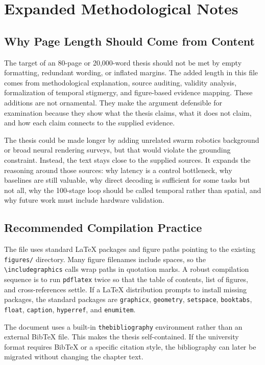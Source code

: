 \documentclass[12pt,a4paper,oneside]{report}
\begin{document}
\chapter{Expanded Methodological Notes}

\section{Why Page Length Should Come from Content}

The target of an 80-page or 20,000-word thesis should not be met by empty formatting, redundant wording, or inflated margins. The added length in this file comes from methodological explanation, source auditing, validity analysis, formalization of temporal stigmergy, and figure-based evidence mapping. These additions are not ornamental. They make the argument defensible for examination because they show what the thesis claims, what it does not claim, and how each claim connects to the supplied evidence.

The thesis could be made longer by adding unrelated swarm robotics background or broad neural rendering surveys, but that would violate the grounding constraint. Instead, the text stays close to the supplied sources. It expands the reasoning around those sources: why latency is a control bottleneck, why baselines are still valuable, why direct decoding is sufficient for some tasks but not all, why the 100-stage loop should be called temporal rather than spatial, and why future work must include hardware validation.

\section{Recommended Compilation Practice}

The file uses standard LaTeX packages and figure paths pointing to the existing \texttt{figures/} directory. Many figure filenames include spaces, so the \texttt{\textbackslash includegraphics} calls wrap paths in quotation marks. A robust compilation sequence is to run \texttt{pdflatex} twice so that the table of contents, list of figures, and cross-references settle. If a LaTeX distribution prompts to install missing packages, the standard packages are \texttt{graphicx}, \texttt{geometry}, \texttt{setspace}, \texttt{booktabs}, \texttt{float}, \texttt{caption}, \texttt{hyperref}, and \texttt{enumitem}.

The document uses a built-in \texttt{thebibliography} environment rather than an external BibTeX file. This makes the thesis self-contained. If the university format requires BibTeX or a specific citation style, the bibliography can later be migrated without changing the chapter text.
\end{document}

